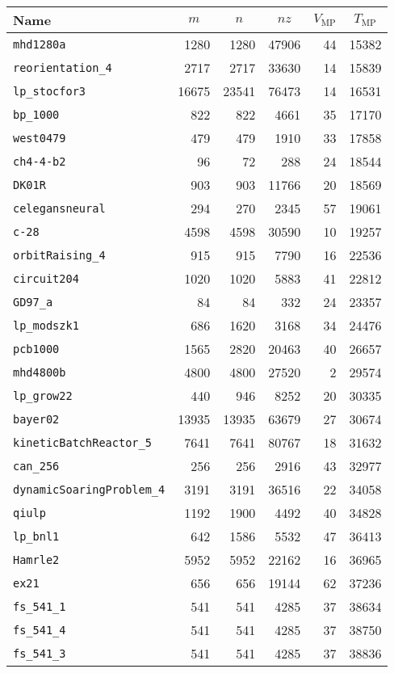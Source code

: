 \begin{table*}[p]
\begin{center}
\begin{tabular}{lrrrrr}
\hline
Name&\multicolumn{1}{c}{$m$}&
\multicolumn{1}{c}{$n$}&
\multicolumn{1}{c}{$nz$}&
\multicolumn{1}{c}{$V_{\mathrm{MP}}$}&
\multicolumn{1}{c}{$T_{\mathrm{MP}}$}\\
\hline
\hline
\texttt{mhd1280a}&1280&1280&47906&44&15382\\
\texttt{reorientation\_4}&2717&2717&33630&14&15839\\
\texttt{lp\_stocfor3}&16675&23541&76473&14&16531\\
\texttt{bp\_1000}&822&822&4661&35&17170\\
\texttt{west0479}&479&479&1910&33&17858\\
\texttt{ch4-4-b2}&96&72&288&24&18544\\
\texttt{DK01R}&903&903&11766&20&18569\\
\texttt{celegansneural}&294&270&2345&57&19061\\
\texttt{c-28}&4598&4598&30590&10&19257\\
\texttt{orbitRaising\_4}&915&915&7790&16&22536\\
\texttt{circuit204}&1020&1020&5883&41&22812\\
\texttt{GD97\_a}&84&84&332&24&23357\\
\texttt{lp\_modszk1}&686&1620&3168&34&24476\\
\texttt{pcb1000}&1565&2820&20463&40&26657\\
\texttt{mhd4800b}&4800&4800&27520&2&29574\\
\texttt{lp\_grow22}&440&946&8252&20&30335\\
\texttt{bayer02}&13935&13935&63679&27&30674\\
\texttt{kineticBatchReactor\_5}&7641&7641&80767&18&31632\\
\texttt{can\_256}&256&256&2916&43&32977\\
\texttt{dynamicSoaringProblem\_4}&3191&3191&36516&22&34058\\
\texttt{qiulp}&1192&1900&4492&40&34828\\
\texttt{lp\_bnl1}&642&1586&5532&47&36413\\
\texttt{Hamrle2}&5952&5952&22162&16&36965\\
\texttt{ex21}&656&656&19144&62&37236\\
\texttt{fs\_541\_1}&541&541&4285&37&38634\\
\texttt{fs\_541\_4}&541&541&4285&37&38750\\
\texttt{fs\_541\_3}&541&541&4285&37&38836\\

\end{tabular}
\end{center}
\end{table*}
